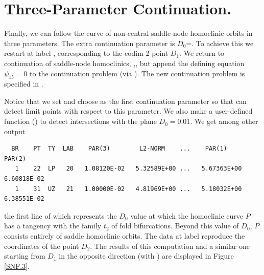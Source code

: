 \documentclass[12pt]{report}
\begin{document}
\section{Three-Parameter Continuation.}
Finally, we can follow the curve of non-central saddle-node homoclinic
orbits in three parameters. The extra continuation parameter is
$D_0$=.  To achieve this we restart at label ,
corresponding to the codim 2 point $D_1$. We return to continuation of
saddle-node homoclinics, ,, but append the
defining equation $\psi_{15}=0$ to the continuation problem
(via ). The new
continuation problem is specified in .
\begin{center}
\end{center}
Notice that we set  and choose  as the first 
continuation parameter so that \AUTO can detect limit points 
with respect to this parameter. We also make a user-defined function
()
to detect intersections with the plane $D_0=0.01$.
We get among other output
\begin{verbatim}
  BR    PT  TY  LAB    PAR(3)        L2-NORM    ...    PAR(1)        PAR(2)
   1    22  LP   20   1.08120E-02   5.32589E+00 ...   5.67363E+00   6.60818E-02
   1    31  UZ   21   1.00000E-02   4.81969E+00 ...   5.18032E+00   6.38551E-02
\end{verbatim}
the first line of which represents the $D_0$ value at which 
the homoclinic curve $P$ has a tangency with the family $t_2$ 
of fold bifurcations. Beyond this value of $D_0$,
$P$ consists entirely of saddle homoclinic orbits. The data at label  
reproduce the coordinates of the point $D_2$. The results of this
computation and a similar one starting from $D_1$ in the opposite direction
(with ) are displayed in Figure \ref{SNF.3}.
%
\end{document}
